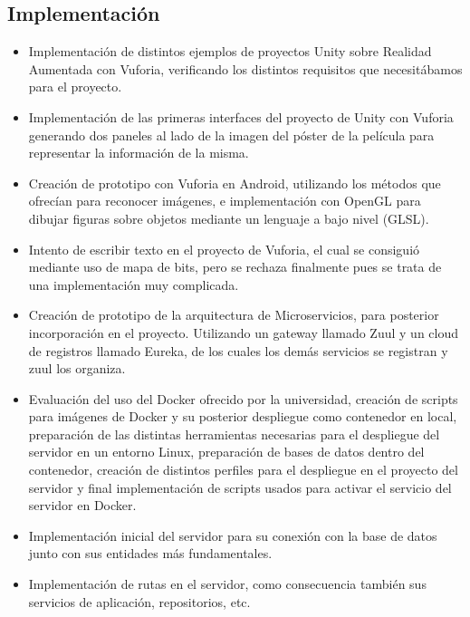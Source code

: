     \subsection{Implementación}
    \label{makereference7.4.3}
        \begin{itemize}
            \item Implementación de distintos ejemplos de proyectos Unity sobre Realidad Aumentada
            con Vuforia, verificando los distintos requisitos
            que necesitábamos para el proyecto. 
            \item Implementación de las primeras interfaces del proyecto de Unity con Vuforia generando dos 
            paneles al lado de la imagen del póster de la película para representar la información de la misma.
            \item Creación de prototipo con Vuforia en Android, utilizando los métodos que ofrecían para reconocer imágenes,
            e implementación con OpenGL para dibujar figuras sobre objetos mediante un lenguaje a bajo nivel (GLSL).
            \item Intento de escribir texto en el proyecto de Vuforia, el cual se consiguió mediante uso de mapa de bits, pero se rechaza 
            finalmente pues se trata de una implementación muy complicada.
            \item Creación de prototipo de la arquitectura de Microservicios, para posterior 
            incorporación en el proyecto. Utilizando un gateway llamado Zuul y un cloud de registros llamado Eureka, de los cuales 
            los demás servicios se registran y zuul los organiza.
            \item Evaluación del uso del Docker ofrecido por la universidad, creación de 
            scripts para imágenes de Docker y su posterior despliegue como contenedor en local, preparación de las distintas herramientas 
            necesarias para el despliegue del servidor en un entorno Linux, preparación de bases de datos dentro del contenedor, creación 
            de distintos perfiles para el despliegue en el proyecto del servidor y final implementación de scripts usados para activar el servicio 
            del servidor en Docker.
            \item Implementación inicial del servidor para su conexión con la base de datos junto con sus entidades más fundamentales.
            \item Implementación de rutas en el servidor, como consecuencia también sus servicios de aplicación, repositorios, etc.

\end{itemize}
